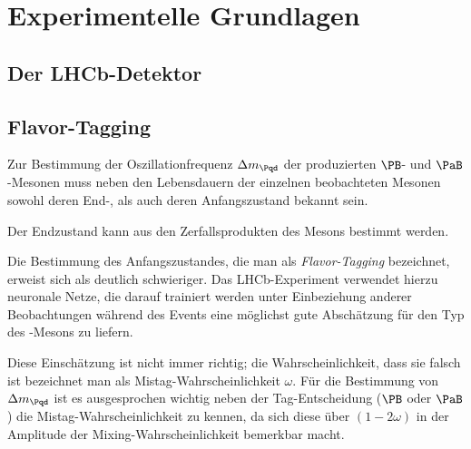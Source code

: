 
\section{Experimentelle Grundlagen}


\subsection{Der LHCb-Detektor}


\subsection{Flavor-Tagging}

Zur Bestimmung der Oszillationfrequenz $\Delta m_{\Pqd}$ der produzierten $\PB$- und $\PaB$-Mesonen muss neben den Lebensdauern der einzelnen beobachteten Mesonen sowohl deren End-, als auch deren Anfangszustand bekannt sein.

Der Endzustand kann aus den Zerfallsprodukten des Mesons bestimmt werden.

Die Bestimmung des Anfangszustandes, die man als \emph{Flavor-Tagging} bezeichnet, erweist sich als deutlich schwieriger.
Das LHCb-Experiment verwendet hierzu neuronale Netze, die darauf trainiert werden unter Einbeziehung anderer Beobachtungen während des Events eine möglichst gute Abschätzung für den Typ des \PB-Mesons zu liefern.

Diese Einschätzung ist nicht immer richtig; die Wahrscheinlichkeit, dass sie falsch ist bezeichnet man als Mistag-Wahrscheinlichkeit $\omega$.
Für die Bestimmung von $\Delta m_{\Pqd}$ ist es ausgesprochen wichtig neben der Tag-Entscheidung ($\PB$ oder $\PaB$) die Mistag-Wahrscheinlichkeit zu kennen, da sich diese über $(1 - 2\omega)$ in der Amplitude der Mixing-Wahrscheinlichkeit bemerkbar macht.

